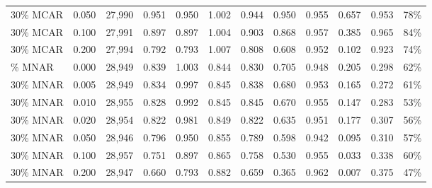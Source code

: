 \begin{table}[t]
{\begin{tabular}{@{}lrrrrrrrrrrr@{}}
30\% MCAR & 0.050 & 27{,}990 & 0.951 & 0.950 & 1.002 & 0.944 & 0.950 & 0.955 & 0.657 & 0.953 & 78\% \\
30\% MCAR & 0.100 & 27{,}991 & 0.897 & 0.897 & 1.004 & 0.903 & 0.868 & 0.957 & 0.385 & 0.965 & 84\% \\
30\% MCAR & 0.200 & 27{,}994 & 0.792 & 0.793 & 1.007 & 0.808 & 0.608 & 0.952 & 0.102 & 0.923 & 74\% \\
\addlinespace
30\% MNAR & 0.000 & 28{,}949 & 0.839 & 1.003 & 0.844 & 0.830 & 0.705 & 0.948 & 0.205 & 0.298 & 62\% \\
30\% MNAR & 0.005 & 28{,}949 & 0.834 & 0.997 & 0.845 & 0.838 & 0.680 & 0.953 & 0.165 & 0.272 & 61\% \\
30\% MNAR & 0.010 & 28{,}955 & 0.828 & 0.992 & 0.845 & 0.845 & 0.670 & 0.955 & 0.147 & 0.283 & 53\% \\
30\% MNAR & 0.020 & 28{,}954 & 0.822 & 0.981 & 0.849 & 0.822 & 0.635 & 0.951 & 0.177 & 0.307 & 56\% \\
30\% MNAR & 0.050 & 28{,}946 & 0.796 & 0.950 & 0.855 & 0.789 & 0.598 & 0.942 & 0.095 & 0.310 & 57\% \\
30\% MNAR & 0.100 & 28{,}957 & 0.751 & 0.897 & 0.865 & 0.758 & 0.530 & 0.955 & 0.033 & 0.338 & 60\% \\
30\% MNAR & 0.200 & 28{,}947 & 0.660 & 0.793 & 0.882 & 0.659 & 0.365 & 0.962 & 0.007 & 0.375 & 47\% \\
\bottomrule\end{tabular}}\end{table}
